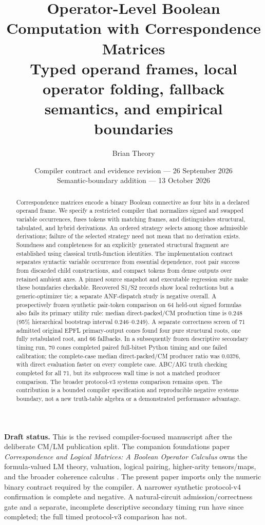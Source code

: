 \documentclass[10pt]{article}
\title{\vspace{-1.3em}\textbf{Operator-Level Boolean Computation with Correspondence Matrices}\\[0.35em]
\large Typed operand frames, local operator folding, fallback semantics, and empirical boundaries}
\author{Brian Theory}
\date{Compiler contract and evidence revision --- 26 September 2026\\Semantic-boundary addition --- 13 October 2026}
\theoremstyle{plain}
\theoremstyle{definition}
\theoremstyle{remark}
\begin{document}
\maketitle

\begin{abstract}
Correspondence matrices encode a binary Boolean connective as four bits in a declared operand frame. We specify a restricted compiler that normalizes signed and swapped variable occurrences, fuses tokens with matching frames, and distinguishes structural, tabulated, and hybrid derivations. An ordered strategy selects among those admissible derivations; failure of the selected strategy need not mean that no derivation exists. Soundness and completeness for an explicitly generated structural fragment are established using classical truth-function identities. The implementation contract separates syntactic variable occurrence from essential dependence, root pair success from discarded child constructions, and compact tokens from dense outputs over retained ambient axes. A pinned source snapshot and executable regression suite make these boundaries checkable. Recovered S1/S2 records show local reductions but a generic-optimizer tie; a separate ANF-dispatch study is negative overall. A prospectively frozen synthetic pair-token comparison on 64 held-out signed formulas also fails its primary utility rule: median direct-packed/CM production time is 0.248 (95\% hierarchical bootstrap interval 0.246--0.249). A separate correctness screen of 71 admitted original EPFL primary-output cones found four pure structural roots, one fully retabulated root, and 66 fallbacks. In a subsequently frozen descriptive secondary timing run, 70 cones completed paired full-bitset Python timing and one failed calibration; the complete-case median direct-packed/CM producer ratio was 0.0376, with direct evaluation faster on every complete case. ABC/AIG truth checking completed for all 71, but its subprocess wall time is not a matched producer comparison. The broader protocol-v3 systems comparison remains open. The contribution is a bounded compiler specification and reproducible negative systems boundary, not a new truth-table algebra or a demonstrated performance advantage.

\end{abstract}

\noindent\textbf{Draft status.} This is the revised compiler-focused manuscript after the deliberate CM/LM publication split. The companion foundations paper \emph{Correspondence and Logical Matrices: A Boolean Operator Calculus} owns the formula-valued LM theory, valuation, logical pairing, higher-arity tensors/maps, and the broader coherence calculus \cite{TheoryFoundations2026}. The present paper imports only the numeric binary contract required by the compiler. A narrower synthetic protocol-v4 confirmation is complete and negative. A natural-circuit admission/correctness gate and a separate, incomplete descriptive secondary timing run have since completed; the full timed protocol-v3 comparison has not.
\end{document}
